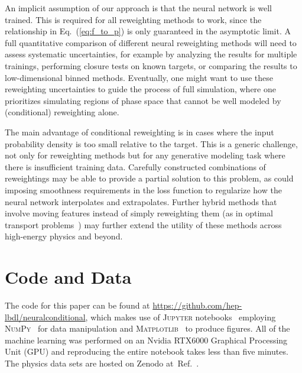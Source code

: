 \documentclass[aps,prx,reprint,preprintnumbers,superscriptaddress,nofootinbib,longbibliography,floatfix]{revtex4-2}
\newcommand{\nocontentsline}[3]{}
\newcommand{\tocless}[2]{\bgroup\let\addcontentsline=\nocontentsline#1{#2}\egroup}
\DeclareRobustCommand{\Eq}[1]{Eq.~(\ref{eq:#1})}
\DeclareRobustCommand{\Ref}[1]{Ref.~\cite{#1}}
\begin{document}
An implicit assumption of our approach is that the neural network is well trained.
%
This is required for all reweighting methods to work, since the relationship in \Eq{f_to_p} is only guaranteed in the asymptotic limit.
%
A full quantitative comparison of different neural reweighting methods will need to assess systematic uncertainties, for example by analyzing the results for multiple trainings, performing closure tests on known targets, or comparing the results to low-dimensional binned methods.
%
Eventually, one might want to use these reweighting uncertainties to guide the process of full simulation, where one prioritizes simulating regions of phase space that cannot be well modeled by (conditional) reweighting alone.


The main advantage of conditional reweighting is in cases where the input probability density is too small relative to the target.
%
This is a generic challenge, not only for reweighting methods but for any generative modeling task where there is insufficient training data.
%
Carefully constructed combinations of reweightings may be able to provide a partial solution to this problem, as could imposing smoothness requirements in the loss function to regularize how the neural network interpolates and extrapolates.
%
Further hybrid methods that involve moving features instead of simply reweighting them (as in optimal transport problems~\cite{Komiske:2019fks,Cai:2020vzx,Romao:2020ojy,Cesarotti:2020hwb,Cesarotti:2020ngq}) may further extend the utility of these methods across high-energy physics and beyond.


\tocless{\section*{Code and Data}}

The code for this paper can be found at \url{https://github.com/hep-lbdl/neuralconditional}, which makes use of \textsc{Jupyter} notebooks~\cite{Kluyver:2016aa} employing \textsc{NumPy}~\cite{harris2020array} for data manipulation and \textsc{Matplotlib}~\cite{Hunter:2007} to produce figures. All of the machine learning was performed on an Nvidia RTX6000 Graphical Processing Unit (GPU) and reproducing the entire notebook takes less than five minutes.  The physics data sets are hosted on Zenodo at~\Ref{komiske_patrick_2019_3341502,komiske_patrick_2019_3341770,komiske_patrick_2019_3341772,nachman_benjamin_2021_5108967}. 

~\\
\end{document}

